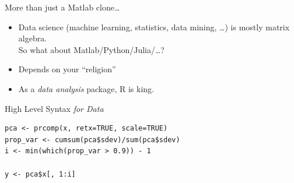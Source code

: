 \begin{frame}
  \begin{block}{More than just a Matlab clone\dots}\pause
  \begin{itemize}[<+-|alert@+>]
    \item Data science (machine learning, statistics, data mining, \dots) is 
mostly matrix algebra.  \\[.2cm]
     So what about Matlab/Python/Julia/\dots ?
    \item Depends on your ``religion'' 
    \item As a \emph{data analysis} package, R is king.
  \end{itemize}
\end{block}
\end{frame}



\begin{frame}[fragile]
\begin{block}{High Level Syntax \emph{for Data}}\pause
\begin{lstlisting}
pca <- prcomp(x, retx=TRUE, scale=TRUE)
prop_var <- cumsum(pca$sdev)/sum(pca$sdev)
i <- min(which(prop_var > 0.9)) - 1

y <- pca$x[, 1:i]
\end{lstlisting}
\end{block}
\end{frame}








